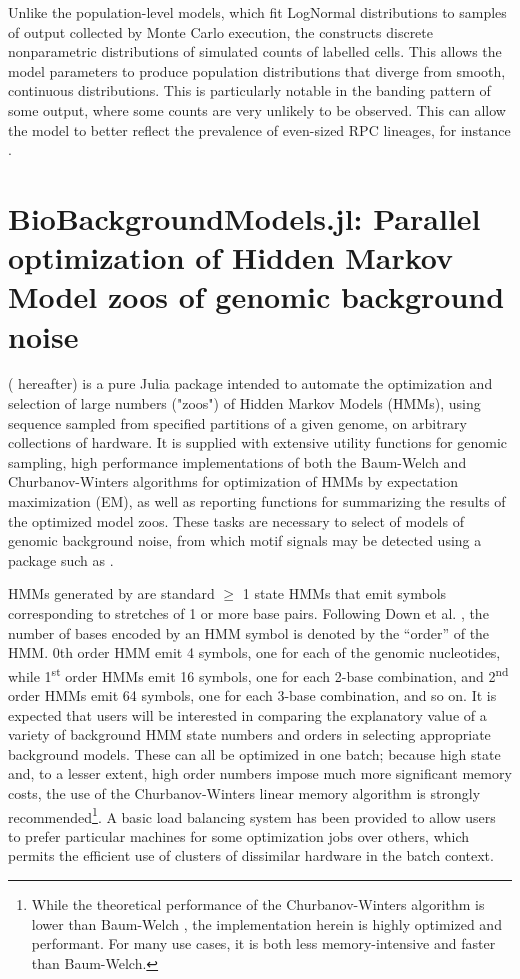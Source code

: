 \documentclass{ut-thesis}
\begin{document}
\begin{NoHyper}
Unlike the population-level models, which fit LogNormal distributions to samples of output collected by Monte Carlo execution, the  constructs discrete nonparametric distributions of simulated counts of labelled cells. This allows the model parameters to produce population distributions that diverge from smooth, continuous distributions. This is particularly notable in the banding pattern of some output, where some counts are very unlikely to be observed. This can allow the model to better reflect the prevalence of even-sized RPC lineages, for instance \cite{He2012}.
\chapter{BioBackgroundModels.jl: Parallel optimization of Hidden Markov Model zoos of genomic background noise}
\label{chap:BBM}

 ( hereafter) is a pure Julia package intended to automate the optimization and selection of large numbers ("zoos") of Hidden Markov Models (HMMs), using sequence sampled from specified partitions of a given genome, on arbitrary collections of hardware. It is supplied with extensive utility functions for genomic sampling, high performance implementations of both the Baum-Welch and Churbanov-Winters algorithms for optimization of HMMs by expectation maximization (EM), as well as reporting functions for summarizing the results of the optimized model zoos. These tasks are necessary to select of models of genomic background noise, from which motif signals may be detected using a package such as .

HMMs generated by  are standard $\geq$ 1 state HMMs that emit symbols corresponding to stretches of 1 or more base pairs. Following Down et al. \cite{Down2005}, the number of bases encoded by an HMM symbol is denoted by the ``order'' of the HMM. 0th order HMM emit 4 symbols, one for each of the genomic nucleotides, while 1\textsuperscript{st} order HMMs emit 16 symbols, one for each 2-base combination, and 2\textsuperscript{nd} order HMMs emit 64 symbols, one for each 3-base combination, and so on. It is expected that users will be interested in comparing the explanatory value of a variety of background HMM state numbers and orders in selecting appropriate background models. These can all be optimized in one batch; because high state and, to a lesser extent, high order numbers impose much more significant memory costs, the use of the Churbanov-Winters linear memory algorithm is strongly recommended\footnote{While the theoretical performance of the Churbanov-Winters algorithm is lower than Baum-Welch \cite{Churbanov2008}, the implementation herein is highly optimized and performant. For many use cases, it is both less memory-intensive and faster than Baum-Welch.}. A basic load balancing system has been provided to allow users to prefer particular machines for some optimization jobs over others, which permits the efficient use of clusters of dissimilar hardware in the batch context.


\end{NoHyper}
\end{document}

